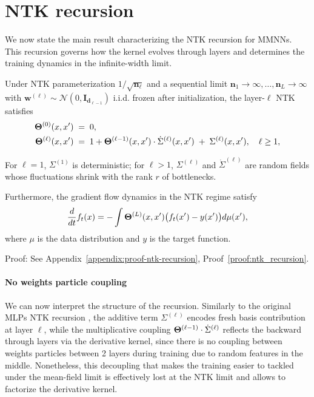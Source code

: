 \section{NTK recursion}

We now state the main result characterizing the NTK recursion for MMNNs. This recursion governs how the kernel evolves through layers and determines the training dynamics in the infinite-width limit.

\begin{theorem}\label{thm:ntk_recursion}
Under NTK parameterization \( 1/\sqrt{\bm{n}_\ell} \) and a sequential limit \( \bm{n}_1\to\infty,\dots,\bm{n}_L\to\infty \) with \( \bm{w}^{(\ell)} \sim \mathcal{N}(0, \mathbf{I}_{\bm{d}_{\ell-1}}) \) i.i.d. frozen after initialization, the layer-\( \ell \) NTK satisfies
\begin{align}
\boldsymbol{\Theta}^{(0)}(x,x') \;&=\; 0, \\
\boldsymbol{\Theta}^{(\ell)}(x,x') \;&=\; 1+ \boldsymbol{\Theta}^{(\ell-1)}(x,x')\cdot\dot{\Sigma}^{(\ell)}(x,x')\;+\;\Sigma^{(\ell)}(x,x'),\quad \ell\ge1,
\end{align}

For \( \ell=1 \), \( \Sigma^{(1)} \) is deterministic; for \( \ell>1 \), \( \Sigma^{(\ell)} \) and \( \dot{\Sigma}^{(\ell)} \) are random fields whose fluctuations shrink with the rank \( r \) of bottlenecks.

\vspace{0.2cm}
Furthermore, the gradient flow dynamics in the NTK regime satisfy
\[
\frac{d}{dt}f_t(x) = -\int \boldsymbol{\Theta}^{(L)}(x,x') \big(f_t(x') - y(x')\big) d\mu(x'),
\]
where \( \mu \) is the data distribution and \( y \) is the target function.
\end{theorem}

Proof: See Appendix~\ref{appendix:proof-ntk-recursion}, Proof~\ref{proof:ntk_recursion}.

\vspace{0.3cm}
\paragraph{No weights particle coupling}
We can now interpret the structure of the recursion. 
Similarly to the original MLPs NTK recursion \cite{jacot2018neural}, the additive term \( \Sigma^{(\ell)} \) encodes fresh basis contribution at layer \( \ell \), while the multiplicative coupling \( \boldsymbol{\Theta}^{(\ell-1)}\cdot\dot{\Sigma}^{(\ell)} \) reflects the backward through layers via the derivative kernel, since there is no coupling between weights particles between 2 layers during training due to random features in the middle. 
Nonetheless, this decoupling that makes the training easier to tackled under the mean-field limit is effectively lost at the NTK limit and allows to factorize the derivative kernel.

